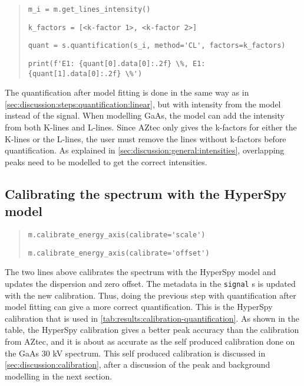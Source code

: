 \begin{quote}
    \verb|m_i = m.get_lines_intensity()|

    \verb|k_factors = [<k-factor 1>, <k-factor 2>] |

    \verb|quant = s.quantification(s_i, method='CL', factors=k_factors)|

    \verb|print(f'E1: {quant[0].data[0]:.2f} \%, E1: {quant[1].data[0]:.2f} \%')|

\end{quote}

The quantification after model fitting is done in the same way as in \cref{sec:discussion:steps:quantification:linear}, but with intensity from the model instead of the signal.
When modelling GaAs, the model can add the intensity from both K-lines and L-lines.
Since AZtec only gives the k-factors for either the K-lines or the L-lines, the user must remove the lines without k-factors before quantification.
As explained in \cref{sec:discussion:general:intensities}, overlapping peaks need to be modelled to get the correct intensities.


\subsection{Calibrating the spectrum with the HyperSpy model}
\label{sec:discussion:steps:HyperSpycalibration}

\begin{quote}

    \verb|m.calibrate_energy_axis(calibrate='scale')|

    \verb|m.calibrate_energy_axis(calibrate='offset')|

\end{quote}

The two lines above calibrates the spectrum with the HyperSpy model and updates the dispersion and zero offset.
The metadata in the \verb|signal| s is updated with the new calibration.
Thus, doing the previous step with quantification after model fitting can give a more correct quantification.
This is the HyperSpy calibration that is used in \cref{tab:results:calibration-quantification}.
As shown in the table, the HyperSpy calibration gives a better peak accuracy than the calibration from AZtec, and it is about as accurate as the self produced calibration done on the GaAs 30 kV spectrum.
This self produced calibration is discussed in \cref{sec:discussion:calibration}, after a discussion of the peak and background modelling in the next section.












